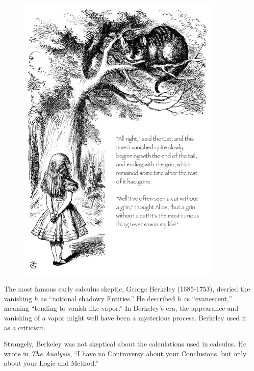 \documentclass[
  letterpaper,
  DIV=11,
  numbers=noendperiod,
  oneside]{scrreprt}
\begin{document}
\begin{figure}[h]


{\centering \includegraphics[width=0.9\textwidth,height=\textheight]{Differentiation/www/Cheshire-cat.png}

}

\end{figure}

The most famous early calculus skeptic, George Berkeley (1685-1753),
decried the vanishing \(h\) as ``notional shadowy Entities.'' He
described \(h\) as ``evanescent,'' meaning ``tending to vanish like
vapor.''
In Berkeley's era, the appearance and vanishing of a vapor might well
have been a mysterious process. Berkeley used it as a criticism.

Strangely, Berkeley was not skeptical about the calculations used in
calculus. He wrote in \emph{The Analysis}, ``I have no Controversy about
your Conclusions, but only about your Logic and Method.''
\end{document}
